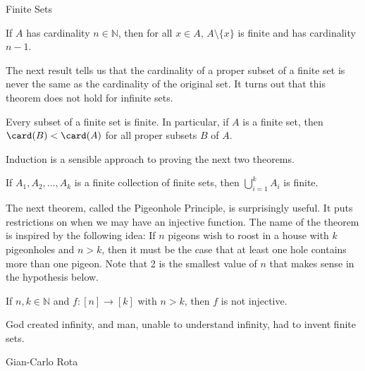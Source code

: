 \begin{section}{Finite Sets}
\begin{theorem}\label{thm:decreaseCardinality}
If $A$ has cardinality $n\in\mathbb{N}$, then for all $x\in A$, $A\setminus \{x\}$ is finite and has cardinality $n-1$. 
\end{theorem}

The next result tells us that the cardinality of a proper subset of a finite set is never the same as the cardinality of the original set.  It turns out that this theorem does not hold for infinite sets. 

\begin{theorem}\label{thm:cardinalityProperSubsetsFinite}
Every subset of a finite set is finite. In particular, if $A$ is a finite set, then $\card(B)<\card(A)$ for all proper subsets $B$ of $A$.
\end{theorem}

Induction is a sensible approach to proving the next two theorems.

\begin{theorem}
If $A_1,A_2,\ldots, A_k$ is a finite collection of finite sets, then $\displaystyle \bigcup_{i=1}^k A_i$ is finite.
\end{theorem}

The next theorem, called the Pigeonhole Principle, is surprisingly useful. It puts restrictions on when we may have an injective function. The name of the theorem is inspired by the following idea: If $n$ pigeons wish to roost in a house with $k$ pigeonholes and $n>k$, then it must be the case that at least one hole contains more than one pigeon.  Note that 2 is the smallest value of $n$ that makes sense in the hypothesis below.

\begin{theorem}
If $n,k\in\mathbb{N}$ and $f:[n]\to [k]$ with $n>k$, then $f$ is not injective.
\end{theorem}

\epigraph{God created infinity, and man, unable to understand infinity, had to invent finite sets.}{Gian-Carlo Rota}

\end{section}